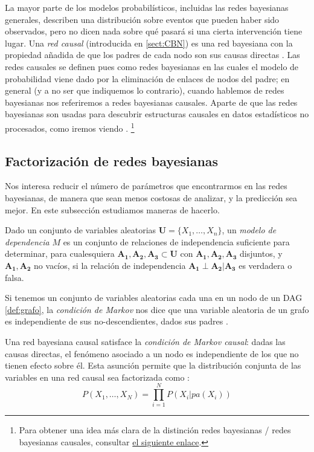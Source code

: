 La mayor parte de los modelos probabilísticos, incluidas las redes bayesianas generales, describen 
una distribución sobre eventos que pueden haber sido observados, pero no dicen nada sobre qué pasará 
si una cierta intervención tiene lugar. Una {\em red causal} (introducida en \ref{sect:CBN}) es una red bayesiana 
con la propiedad añadida de que los padres de cada nodo son sus causas directas \cite{pearl-and-rusell}. 
Las redes causales se definen pues como redes bayesianas en las cuales el modelo de probabilidad 
viene dado por la eliminación de enlaces de nodos del padre; en general (y a no ser que indiquemos lo contrario), 
cuando hablemos de redes bayesianas nos referiremos a redes bayesianas causales.
Aparte de que las redes bayesianas son usadas para descubrir estructuras causales en datos estadísticos no 
procesados, como iremos viendo \cite{causal-discov}. \footnote{Para obtener una idea más clara de la distinción redes bayesianas / redes bayesianas causales, consultar 
\href{https://armahmood.github.io/files/mahmood-TR11-01.pdf}{el siguiente enlace}.}

\subsection{Factorización de redes bayesianas}
Nos interesa reducir el número de parámetros que encontrarmos en las redes bayesianas, de manera que sean menos 
costosas de analizar, y la predicción sea mejor. En este subsección estudiamos maneras de hacerlo.

Dado un conjunto de variables aleatorias $\mathbf{U} = \{X_1, \dots, X_n\}$, un {\em modelo de dependencia} $M$ 
es un conjunto de relaciones de independencia suficiente para determinar, para cualesquiera $\mathbf{A_1}, 
\mathbf{A_2}, \mathbf{A_3} \subset \mathbf{U}$ con $\mathbf{A_1}, \mathbf{A_2}, \mathbf{A_3}$
disjuntos, y $\mathbf{A_1}, \mathbf{A_2}$ no vacíos, si la relación de independencia $\mathbf{A_1} \perp 
\mathbf{A_2} | \mathbf{A_3}$ es verdadera o falsa. 

Si tenemos un conjunto de variables aleatorias cada una en un nodo de un DAG \ref{def:grafo}, la {\em condición 
de Markov} nos dice que una variable aleatoria de un grafo es independiente de sus no-descendientes, dados 
sus padres \cite{markov-assumption}. 

Una red bayesiana causal satisface la {\em condición de Markov causal}: dadas las causas directas, el fenómeno 
asociado a un nodo es independiente de los que no tienen efecto sobre él. Esta asunción permite que la distribución 
conjunta de las variables en una red causal sea factorizada como \cite{LCBN}:
$$ P(X_{1}, \dots,X_{N}) = \prod_{i=1}^{N} P(X_{i} | pa(X_{i}))$$ 

